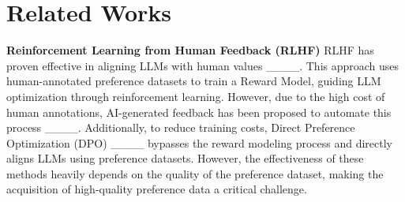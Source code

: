 \section{Related Works}
\textbf{Reinforcement Learning from Human Feedback (RLHF)} 
RLHF has proven effective in aligning LLMs with human values ____. This approach uses human-annotated preference datasets to train a Reward Model, guiding LLM optimization through reinforcement learning. However, due to the high cost of human annotations, AI-generated feedback has been proposed to automate this process ____.
Additionally, to reduce training costs, Direct Preference Optimization (DPO) ____ bypasses the reward modeling process and directly aligns LLMs using preference datasets. However, the effectiveness of these methods heavily depends on the quality of the preference dataset, making the acquisition of high-quality preference data a critical challenge.

